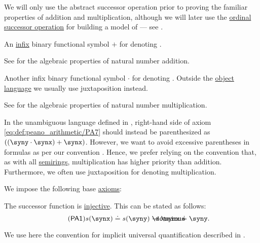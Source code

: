 \begin{definition}
\begin{thmenum}[series=def:peano_arithmetic]
    We will only use the abstract successor operation prior to proving the familiar properties of addition and multiplication, although we will later use the \hyperref[def:ordinal_successor]{ordinal successor operation} for building a model of  --- see .

     An \hyperref[rem:first_order_formula_conventions/infix]{infix} binary functional symbol \( + \) for denoting .

    See  for the algebraic properties of natural number addition.

     Another infix binary functional symbol \( \cdot \) for denoting . Outside the \hyperref[con:metalogic]{object language} we usually use juxtaposition instead.

    See  for the algebraic properties of natural number multiplication.

    In the unambiguous language defined in , right-hand side of axiom \eqref{eq:def:peano_arithmetic/PA7} should instead be parenthesized as \( ((\syny \cdot \synx) + \synx) \). However, we want to avoid excessive parentheses in formulas as per our convention . Hence, we prefer relying on the convention that, as with all \hyperref[def:semiring]{semirings}, multiplication has higher priority than addition. Furthermore, we often use juxtaposition for denoting multiplication.
  \end{thmenum}

  We impose the following base \hyperref[def:first_order_theory/axiomatized]{axioms}:
  \begin{thmenum}[resume=def:peano_arithmetic]
     The successor function is \hyperref[thm:function_invertibility_categorical/nonempty_left_invertible]{injective}. This can be stated as follows:
    \begin{equation}\label{eq:def:peano_arithmetic/PA1}\tag{\logic{PA1}}
      s(\synx) \syneq s(\syny) \synimplies \synx \syneq \syny.
    \end{equation}

    We use here the convention for implicit universal quantification described in .


\end{thmenum}
\end{definition}
